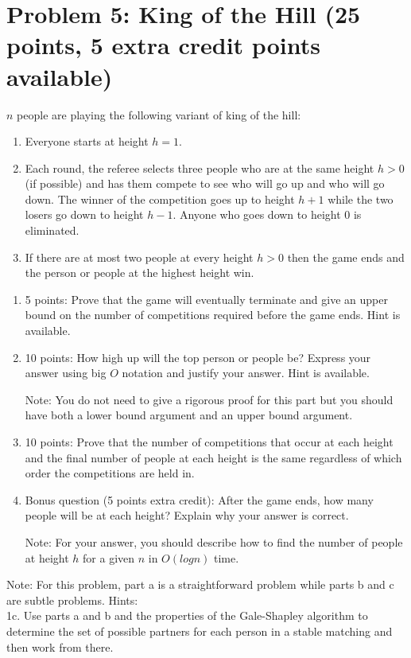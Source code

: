 \documentclass[12pt]{article}
\begin{document}
\section*{Problem 5: King of the Hill (25 points, 5 extra credit points available)}
$n$ people are playing the following variant of king of the hill:
\begin{enumerate}
\item Everyone starts at height $h = 1$.
\item Each round, the referee selects three people who are at the same height $h > 0$ (if possible) and has them compete to see who will go up and who will go down. The winner of the competition goes up to height $h+1$ while the two losers go down to height $h-1$. Anyone who goes down to height $0$ is eliminated.
\item If there are at most two people at every height $h > 0$ then the game ends and the person or people at the highest height win.
\end{enumerate}
\begin{enumerate}
\item[(a)] 5 points: Prove that the game will eventually terminate and give an upper bound on the number of competitions required before the game ends. Hint is available.
\item[(b)] 10 points: How high up will the top person or people be? Express your answer using big $O$ notation and justify your answer. Hint is available.

Note: You do not need to give a rigorous proof for this part but you should have both a lower bound argument and an upper bound argument.
\item[(c)] 10 points: Prove that the number of competitions that occur at each height and the final number of people at each height is the same regardless of which order the competitions are held in.
\item[(d)] Bonus question (5 points extra credit): After the game ends, how many people will be at each height? Explain why your answer is correct.

Note: For your answer, you should describe how to find the number of people at height $h$ for a given $n$ in $O(logn)$ time.
\end{enumerate}
Note: For this problem, part a is a straightforward problem while parts b and c are subtle problems.
\newpage
\noindent Hints:\\
1c. Use parts a and b and the properties of the Gale-Shapley algorithm to determine the set of possible partners for each person in a stable matching and then work from there.\\
\end{document}
